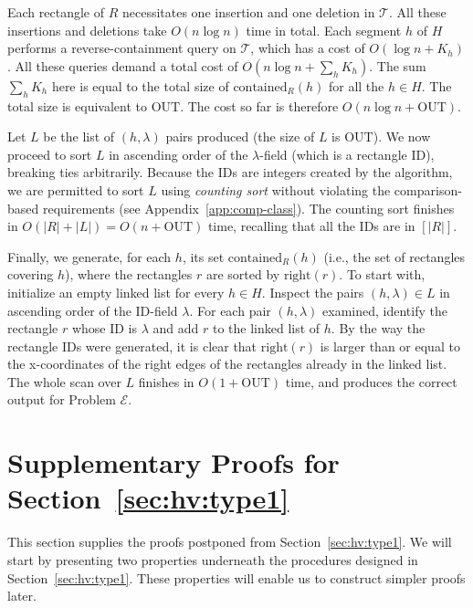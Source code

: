 \documentclass[acmsmall,review,anonymous]{acmart}
\def\vgap{\vspace{1mm}}
\def\T{\mathcal{T}}
\def\xright{\mathrm{right}}
\def\contained{\mathrm{contained}}
\def\out{\mathrm{OUT}}
\begin{document}
{{{\vgap

Each rectangle of $R$ necessitates one insertion and one deletion in $\T$. All these insertions and deletions take $O(n \log n)$ time in total. Each segment $h$ of $H$ performs a reverse-containment query on $\T$, which has a cost of $O(\log n + K_h)$. All these queries demand a total cost of $O(n \log n + \sum_h K_h)$. The sum $\sum_h K_h$ here is equal to the total size of $\contained_R(h)$ for all the $h \in H$. The total size is equivalent to $\out$. The cost so far is therefore $O(n \log n + \out)$.

\vgap

Let $L$ be the list of $(h, \lambda)$ pairs produced (the size of $L$ is $\out$). We now proceed to sort $L$ in ascending order of the $\lambda$-field (which is a rectangle ID), breaking ties arbitrarily. Because the IDs are integers created by the algorithm, we are permitted to sort $L$ using {\em counting sort} without violating the comparison-based requirements (see Appendix~\ref{app:comp-class}). The counting sort finishes in $O(|R| + |L|) = O(n + \out)$ time, recalling that all the IDs are in $[|R|]$.

\vgap

Finally, we generate, for each $h$, its set $\contained_R(h)$ (i.e., the set of rectangles covering $h$), where the rectangles $r$ are sorted by $\xright(r)$. To start with, initialize an empty linked list for every $h \in H$. Inspect the pairs $(h, \lambda) \in L$ in ascending order of the ID-field $\lambda$. For each pair $(h, \lambda)$ examined, identify the rectangle $r$ whose ID is $\lambda$ and add $r$ to the linked list of $h$. By the way the rectangle IDs were generated, it is clear that $\xright(r)$ is larger than or equal to the x-coordinates of the right edges of the rectangles already in the linked list. The whole scan over $L$ finishes in $O(1 + \out)$ time, and produces the correct output for Problem $\mathscr{E}$.


\section{Supplementary Proofs for Section~\ref{sec:hv:type1}} \label{app:hv:type1}

This section supplies the proofs postponed from Section~\ref{sec:hv:type1}. We will start by presenting two properties underneath the procedures designed in Section~\ref{sec:hv:type1}. These properties will enable us to construct simpler proofs later.

}}}
\end{document}
